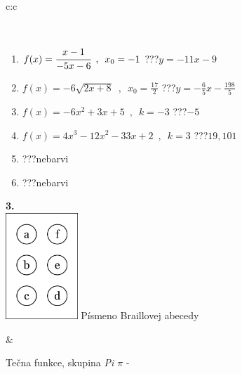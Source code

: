 \documentclass[10pt]{report}
\begin{document}
\begin{tabular}{c:c}
\begin{minipage}[c][104.5mm][t]{0.5\linewidth}
\begin{center}
\begin{minipage}{0.95\linewidth}
\begin{center}
\end{center}
\end{minipage}
\\[1mm]
\begin{minipage}{0.79\linewidth}
\begin{center}
\begin{varwidth}{\linewidth}
\begin{enumerate}
\small
\item $f(x)=\cfrac{x-1}{-5x-6}\enspace , \enspace x_0=-1$\quad \dotfill\; ???\;\dotfill \quad $y = -11x-9$
\item $f(x)=-6\sqrt{2x+8}\enspace , \enspace x_0=\frac{17}{2}$\quad \dotfill\; ???\;\dotfill \quad $y = -\frac{6}{5}x-\frac{198}{5}$
\item $f(x)=-6x^2+3x+5\enspace , \enspace k=-3$\quad \dotfill\; ???\;\dotfill \quad $-5$
\item $f(x)=4x^3-12x^2-33x+2\enspace , \enspace k=3$\quad \dotfill\; ???\;\dotfill \quad $19 , 101$
\item \quad \dotfill\; ???\;\dotfill \quad nebarvi
\item \quad \dotfill\; ???\;\dotfill \quad nebarvi
\end{enumerate}
\end{varwidth}
\end{center}
\end{minipage}
\begin{minipage}{0.20\linewidth}
\begin{center}
{\Huge\bfseries 3.} \\[2mm]
\includegraphics[height=40mm]{../images/braille.png}
{\small Písmeno Braillovej abecedy}
\end{center}
\end{minipage}
\end{center}
\end{minipage}
&
\begin{minipage}[c][104.5mm][t]{0.5\linewidth}
\begin{center}
\vspace{7mm}
{\huge Tečna funkce, skupina \textit{Pi $\pi$} -}\\[5mm]

\end{center}
\end{minipage}
\end{tabular}
\end{document}
